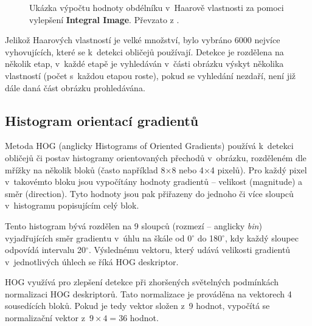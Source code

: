 \begin{figure}[H]
  \begin{center}
  \label{integralimage}
  \caption{Ukázka výpočtu hodnoty obdélníku v~Haarově vlastnosti za pomoci vylepšení \textbf{Integral Image}. Převzato z \cite{violaJonesArticle}.}
  \end{center}
\end{figure}

Jelikož Haarových vlastností je velké množství, bylo vybráno 6000 nejvíce vyhovujících, které se k~detekci obličejů používají. Detekce je rozdělena na několik etap, v~každé etapě je vyhledáván v~části obrázku výskyt několika vlastností (počet s~každou etapou roste), pokud se vyhledání nezdaří, není již dále daná část obrázku prohledávána. 


\subsection*{Histogram orientací gradientů}
Metoda HOG (anglicky Histograms of Oriented Gradients) \cite{hog, hog2} používá k~detekci obličejů či postav histogramy orientovaných přechodů v~obrázku, rozděleném dle mřížky na několik bloků (často například 8$\times$8 nebo 4$\times$4 pixelů). Pro každý pixel v~takovémto bloku jsou vypočítány hodnoty gradientů -- velikost (magnitude) a směr (direction). Tyto hodnoty jsou pak přiřazeny do jednoho či více sloupců v~histogramu popisujícím celý blok.

Tento histogram bývá rozdělen na 9 sloupců (rozmezí -- anglicky \emph{bin}) vyjadřujících směr gradientu v~úhlu na škále od 0$^\circ$ do 180$^\circ$, kdy každý sloupec odpovídá intervalu 20$^\circ$. Výslednému vektoru, který udává velikosti gradientů v~jednotlivých úhlech se říká HOG deskriptor.

HOG využívá pro zlepšení detekce při zhoršených světelných podmínkách normalizaci HOG deskriptorů. Tato normalizace je prováděna na vektorech 4 sousedících bloků. Pokud je tedy vektor složen z~9 hodnot, vypočítá se normalizační vektor z~$9 \times 4 = 36$ hodnot.

